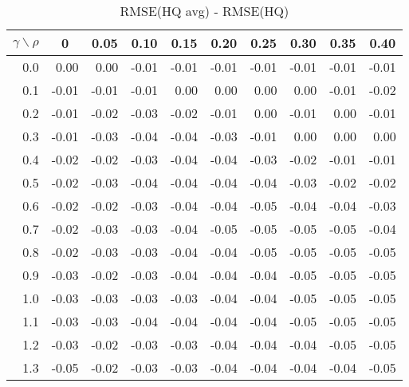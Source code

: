 \documentclass[12pt]{article}
\begin{document}
%
\begin{table}[!tbp]
 \begin{center}
\caption{RMSE(HQ avg) - RMSE(HQ)}
 \begin{tabular}{r|rrrrrrrrr}\hline\hline
\multicolumn{1}{c|}{$\gamma\backslash\rho$}&\multicolumn{1}{c}{0}&\multicolumn{1}{c}{0.05}&\multicolumn{1}{c}{0.10}&\multicolumn{1}{c}{0.15}&\multicolumn{1}{c}{0.20}&\multicolumn{1}{c}{0.25}&\multicolumn{1}{c}{0.30}&\multicolumn{1}{c}{0.35}&\multicolumn{1}{c}{0.40}\tabularnewline
\hline
0.0& 0.00& 0.00&-0.01&-0.01&-0.01&-0.01&-0.01&-0.01&-0.01\tabularnewline
0.1&-0.01&-0.01&-0.01& 0.00& 0.00& 0.00& 0.00&-0.01&-0.02\tabularnewline
0.2&-0.01&-0.02&-0.03&-0.02&-0.01& 0.00&-0.01& 0.00&-0.01\tabularnewline
0.3&-0.01&-0.03&-0.04&-0.04&-0.03&-0.01& 0.00& 0.00& 0.00\tabularnewline
0.4&-0.02&-0.02&-0.03&-0.04&-0.04&-0.03&-0.02&-0.01&-0.01\tabularnewline
0.5&-0.02&-0.03&-0.04&-0.04&-0.04&-0.04&-0.03&-0.02&-0.02\tabularnewline
0.6&-0.02&-0.02&-0.03&-0.04&-0.04&-0.05&-0.04&-0.04&-0.03\tabularnewline
0.7&-0.02&-0.03&-0.03&-0.04&-0.05&-0.05&-0.05&-0.05&-0.04\tabularnewline
0.8&-0.02&-0.03&-0.03&-0.04&-0.04&-0.05&-0.05&-0.05&-0.05\tabularnewline
0.9&-0.03&-0.02&-0.03&-0.04&-0.04&-0.04&-0.05&-0.05&-0.05\tabularnewline
1.0&-0.03&-0.03&-0.03&-0.03&-0.04&-0.04&-0.05&-0.05&-0.05\tabularnewline
1.1&-0.03&-0.03&-0.04&-0.04&-0.04&-0.04&-0.05&-0.05&-0.05\tabularnewline
1.2&-0.03&-0.02&-0.03&-0.03&-0.04&-0.04&-0.04&-0.05&-0.05\tabularnewline
1.3&-0.05&-0.02&-0.03&-0.03&-0.04&-0.04&-0.04&-0.04&-0.05\tabularnewline
\hline
\end{tabular}

\end{center}

\end{table}
\end{document}

